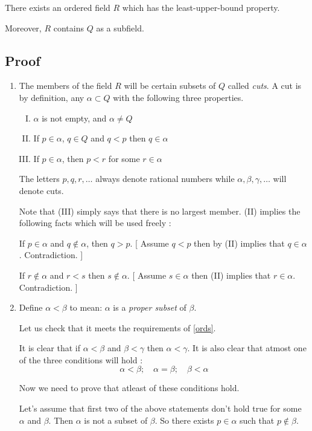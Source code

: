 \begin{thm}
	There exists an ordered field $R$ which has the least-upper-bound property.

	Moreover, $R$ contains $Q$ as a subfield.
\end{thm}

\subsection{Proof}
\begin{enumerate}[{\bf Step 1.}]
\item
The members of the field $R$ will be certain subsets of $Q$ called {\it cuts}.
A cut is by definition, any $\alpha \subset Q$ with the following three properties.

\begin{enumerate}[(I)]
	\item $\alpha$ is not empty, and $\alpha \neq Q$
	\item If $p \in \alpha$, $q \in Q$ and $q < p$ then $q \in \alpha$
	\item If $p \in \alpha$, then $p < r$ for some $r \in \alpha$
\end{enumerate}

The letters $p, q, r, \dots$ always denote rational numbers
while $\alpha, \beta, \gamma, \dots$ will denote cuts.

Note that (III) simply says that there is no largest member.
(II) implies the following facts which will be used freely :

If $p \in \alpha$ and $q \notin \alpha$, then $q > p$.
[ Assume $q < p$ then by (II) implies that $q \in \alpha$. Contradiction. ]

If $r \notin \alpha$ and $r < s$ then $s \notin \alpha$.
[ Assume $s \in \alpha$ then (II) implies that $r \in \alpha$. Contradiction. ]

\item
Define $\alpha < \beta$ to mean: $\alpha$ is a {\it proper subset} of $\beta$.

Let us check that it meets the requirements of \ref{ords}.

It is clear that if $\alpha < \beta$ and $\beta < \gamma$ then $\alpha < \gamma$.
It is also clear that atmost one of the three conditions will hold :
$$ \alpha < \beta; \quad \alpha = \beta; \quad \beta < \alpha $$

Now we need to prove that atleast of these conditions hold.

Let's assume that first two of the above statements don't hold true for some $\alpha$ and $\beta$.
Then $\alpha$ is not a subset of $\beta$.
So there exists $p \in \alpha$ such that $p \notin \beta$.


\end{enumerate}

